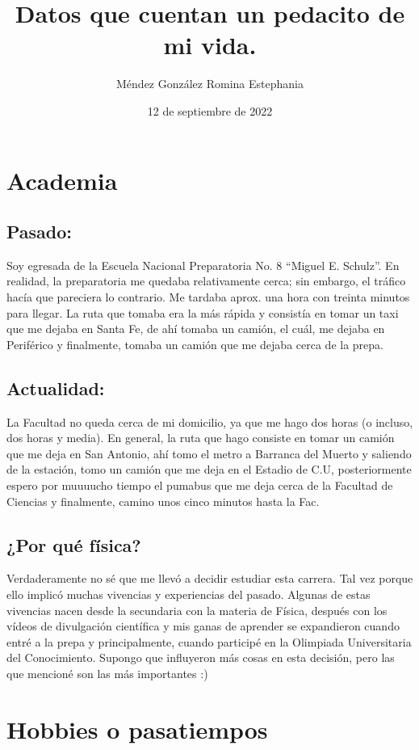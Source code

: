 \documentclass[letterpaper, 12pt]{article}
\title{Datos que cuentan un pedacito de mi vida. }
\author{Méndez González Romina Estephania}
\date{12 de septiembre de 2022}
\begin{document}
\maketitle

\section{\Large{Academia}}
    \subsection{\large{Pasado:}}
        \normalsize{Soy egresada de la Escuela Nacional Preparatoria No. 8 ``Miguel E. Schulz''. En realidad, la preparatoria me quedaba relativamente cerca; sin embargo, el tráfico hacía que pareciera lo contrario. Me tardaba aprox. una hora con treinta minutos para llegar. La ruta que tomaba era la más rápida y consistía en tomar un taxi que me dejaba en Santa Fe, de ahí tomaba un camión, el cuál, me dejaba en Periférico y finalmente, tomaba un camión que me dejaba cerca de la prepa.}  
    \subsection{\large{Actualidad:}}
        \normalsize{La Facultad no queda cerca de mi domicilio, ya que me hago dos horas (o incluso, dos horas y media). En general, la ruta que hago consiste en tomar un camión que me deja en San Antonio, ahí tomo el metro a Barranca del Muerto y saliendo de la estación, tomo un camión que me deja en el Estadio de C.U, posteriormente espero por muuuucho tiempo el pumabus que me deja cerca de la Facultad de Ciencias y finalmente, camino unos cinco minutos hasta la Fac.}
    \subsection{\large{¿Por qué física?}}
        \normalsize{Verdaderamente no sé que me llevó a decidir estudiar esta carrera. Tal vez porque ello implicó muchas vivencias y experiencias del pasado. Algunas de estas vivencias nacen desde la secundaria con la materia de Física, después con los vídeos de divulgación científica y mis ganas de aprender se expandieron cuando entré a la prepa y principalmente, cuando participé en la Olimpiada Universitaria del Conocimiento. Supongo que influyeron más cosas en esta decisión, pero las que mencioné son las más importantes :)}
    

\section{\Large{Hobbies o pasatiempos}}
\end{document}
